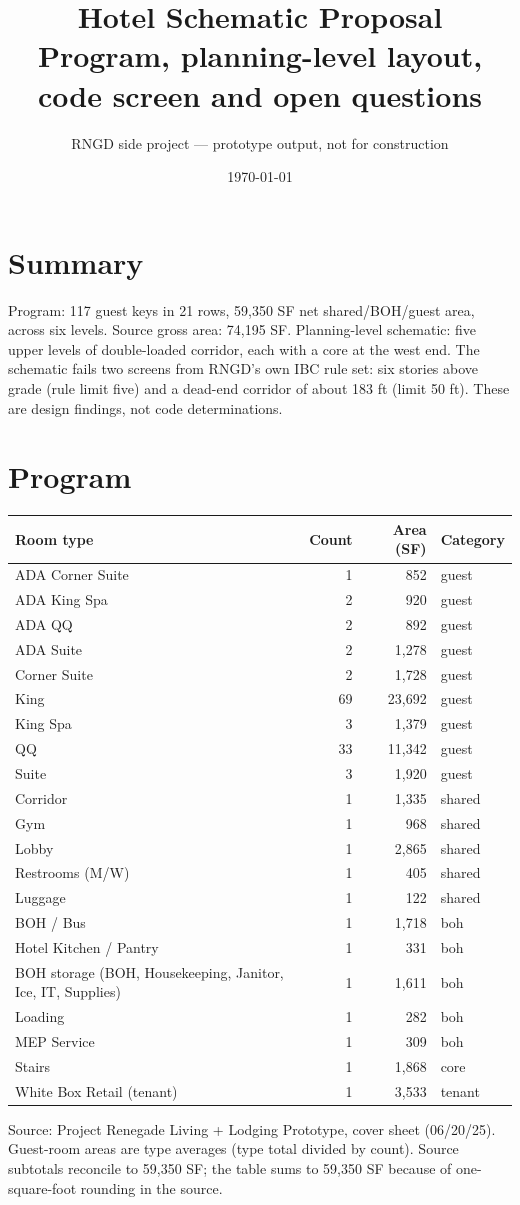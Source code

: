 \documentclass[10pt]{article}
\title{Hotel Schematic Proposal\\\large Program, planning-level layout, code screen and open questions}
\author{RNGD side project --- prototype output, not for construction}
\date{\today}
\begin{document}
\maketitle

\section{Summary}
Program: 117 guest keys in 21 rows, 59,350 SF net shared/BOH/guest area,
across six levels. Source gross area: 74,195 SF. Planning-level schematic: five upper levels of
double-loaded corridor, each with a core at the west end. The schematic fails two screens from RNGD's
own IBC rule set: six stories above grade (rule limit five) and a dead-end corridor of about
183 ft (limit 50 ft). These are design findings, not code determinations.

\section{Program}
\begin{longtable}{p{7.2cm}rrl}\toprule
Room type & Count & Area (SF) & Category \\ \midrule
\endhead
ADA Corner Suite & 1 & 852 & guest \\
ADA King Spa & 2 & 920 & guest \\
ADA QQ & 2 & 892 & guest \\
ADA Suite & 2 & 1,278 & guest \\
Corner Suite & 2 & 1,728 & guest \\
King & 69 & 23,692 & guest \\
King Spa & 3 & 1,379 & guest \\
QQ & 33 & 11,342 & guest \\
Suite & 3 & 1,920 & guest \\
Corridor & 1 & 1,335 & shared \\
Gym & 1 & 968 & shared \\
Lobby & 1 & 2,865 & shared \\
Restrooms (M/W) & 1 & 405 & shared \\
Luggage & 1 & 122 & shared \\
BOH / Bus & 1 & 1,718 & boh \\
Hotel Kitchen / Pantry & 1 & 331 & boh \\
BOH storage (BOH, Housekeeping, Janitor, Ice, IT, Supplies) & 1 & 1,611 & boh \\
Loading & 1 & 282 & boh \\
MEP Service & 1 & 309 & boh \\
Stairs & 1 & 1,868 & core \\
White Box Retail (tenant) & 1 & 3,533 & tenant \\
\bottomrule
\end{longtable}
Source: Project Renegade Living + Lodging Prototype, cover sheet (06/20/25). Guest-room areas are type averages (type total divided by count).
Source subtotals reconcile to 59,350 SF; the table sums to 59,350 SF because of one-square-foot rounding in the source.
\end{document}
